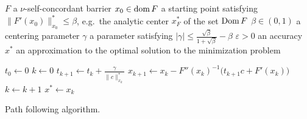 \begin{algorithm}[ht]
  \begin{algorithmic}[1]
    \Require
      \Statex $F$ a $\nu$-self-concordant barrier
      \Statex $x_0 \in \operatorname{dom} F$ a starting point satisfying $\|F'(x_0)\|^*_{x_0} \leq \beta$, e.g.\ the analytic center $x^*_F$ of the set $\operatorname{Dom} F$
      \Statex $\beta \in (0,1)$ a centering parameter
      \Statex $\gamma$ a parameter satisfying $|\gamma| \leq \frac{\sqrt{\beta}}{1+\sqrt{\beta}} - \beta$
      \Statex $\varepsilon > 0$ an accuracy
    \Ensure
      \Statex $x^*$ an approximation to the optimal solution to the minimization problem 
      \Statex

    \State $t_0 \gets 0$
    \State $k \gets 0$
      \State $t_{k+1} \gets t_k + \frac{\gamma}{\|c\|^*_{x_k}}$
      \State $x_{k+1} \gets x_k - F''(x_k)^{-1}\big(t_{k+1}c + F'(x_k)\big)$
      \State $k \gets k + 1$
    \EndWhile
    \State \Return $x^* \gets x_k$

  \end{algorithmic}
  \caption{Path following algorithm. \cite[Scheme~4.2.23]{Nesterov-2004}}
\end{algorithm}
